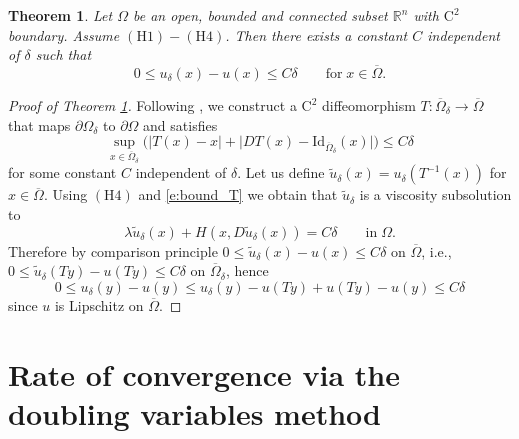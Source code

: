 \documentclass[11pt,reqno]{amsart}
\numberwithin{figure}{section}
\theoremstyle{plain}
\newtheorem{thm}{Theorem}[section]
\theoremstyle{remark}
\numberwithin{equation}{section}
\newcommand{\rmC}{\mathrm{C}}
\begin{document}
\begin{thm}\cite{Capuzzo-Dolcetta1990}\label{thm:conv_general} Let $\Omega$ be an open, bounded and connected subset $\mathbb{R}^n$ with $\mathrm{C}^2$ boundary. Assume $\mathrm{(H1)}-\mathrm{(H4)}$. 
Then there exists a constant $C$ independent of $\delta$ such that
\begin{equation*}
    0\leq u_\delta(x) - u(x) \leq C\delta \qquad\text{for}\; x\in \overline{\Omega}.
\end{equation*}
\end{thm}
\begin{proof}[Proof of Theorem \ref{thm:conv_general}] Following \cite{Capuzzo-Dolcetta1990}, we construct a $\rmC^2$ diffeomorphism $T:\overline{\Omega}_\delta\to \overline{\Omega}$ that maps $\partial\Omega_\delta$ to $\partial\Omega$ and satisfies
\begin{equation}\label{e:bound_T}
    \sup_{x\in \overline{\Omega}_\delta}\Big(|T(x)-x| + \big|DT(x) - \mathrm{Id}_{\overline{\Omega}_\delta}(x)\big|\Big) \leq C\delta
\end{equation}
for some constant $C$ independent of $\delta$. Let us define $\tilde{u}_\delta(x) = u_\delta\left(T^{-1}(x)\right)$ for $x\in \overline{\Omega}$. Using $\mathrm{(H4)}$ and \eqref{e:bound_T} we obtain that $\tilde{u}_\delta$ is a viscosity subsolution to
\begin{equation*}
    \lambda \tilde{u}_\delta(x) + H(x,D\tilde{u}_\delta(x))  = C\delta \qquad\text{in}\;\Omega.
\end{equation*}
Therefore by comparison principle $0\leq \tilde{u}_\delta(x) - u(x) \leq C\delta$ on $\overline{\Omega}$, i.e., $0\leq \tilde{u}_\delta(Ty) - u(Ty) \leq C\delta$ on $\overline{\Omega}_\delta$, hence
\begin{equation*}
    0 \leq u_\delta(y) - u(y) \leq u_\delta(y) - u(Ty) + u(Ty) - u(y) \leq C\delta
\end{equation*}
since $u$ is Lipschitz on $\overline{\Omega}$.
\end{proof}


\section{Rate of convergence via the doubling variables method}
\end{document}
